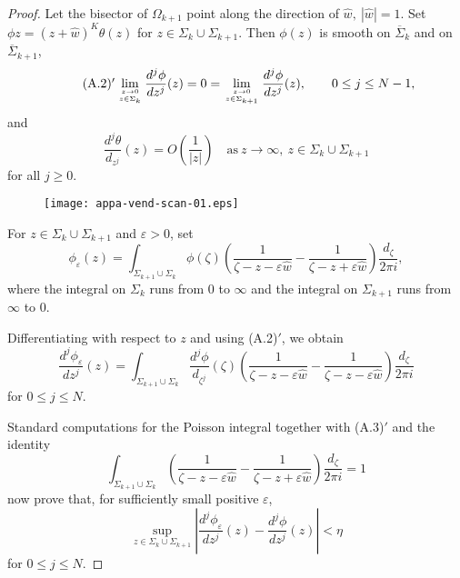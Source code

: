 \documentclass{surv-l}
\theoremstyle{plain}
\theoremstyle{definition}
\numberwithin{equation}{chapter}
\begin{document}
{\begin{proof}
Let the bisector of $\Omega_{k+1}$ point along the direction of $\hat{w},\ |\hat{w}|=1$. Set $\phi{z}=(z+\hat{w})^{K}\theta(z)$ for $z\in\Sigma_{k}\cup\Sigma_{k+1}$. Then $\phi(z)$ is smooth on $\overline{\Sigma}_{k}$ and on $\overline{\Sigma}_{k+1}$,
\begin{equation*}
\tag*{(A.2)$'$}\lim_{{z\rightarrow 0}\atop{z\in\Sigma_{k}}}\frac{d^{j}\phi}{dz^{j}}(z) = 0 = \lim_{{z\rightarrow 0}\atop{z\in\Sigma_{k+1}}}\frac{d^{j}\phi}{dz^{j}}(z),\qquad 0\leq j\leq N-1,
\end{equation*}
and
\begin{equation*}
\tag*{(A.3)$'$}\frac{d^{j}{\theta}}{d_{z^{j}}}(z)=O\left(\frac{1}{|z|}\right)\quad \mathrm{as}\ z\rightarrow\infty,\ z\in\Sigma_{k}\cup\Sigma_{k+1}
\end{equation*}
for all $j\geq 0$.
\setcounter{figure}{15}
\begin{figure}
\texttt{[image: appa-vend-scan-01.eps]}
\caption{}
\label{AppA:fig16}
\end{figure}

For $z\in\Sigma_{k}\cup\Sigma_{k+1}$ and $\varepsilon >0$, set
\begin{equation}\label{eqA.6} \phi_{\varepsilon}(z)=\int_{\Sigma_{k+1}\cup\Sigma_{k}}\phi(\zeta)\left(\frac{1}{\zeta-z-\varepsilon\hat{w}}-\frac{1}{\zeta-z+\varepsilon\hat{w}}\right) \frac{d_{\zeta}}{2\pi i},
\end{equation}
where the integral on $\Sigma_{k}$ runs from $0$ to $\infty$ and the integral on $\Sigma_{k+1}$ runs from $\infty$ to $0$.

Differentiating with respect to $z$ and using (A.2)$'$, we obtain
\begin{equation}\label{eqA.7}
\frac{d^{j}\phi_{\varepsilon}}{dz^{j}}(z)=\int_{\Sigma_{k+1}\cup\Sigma_{k}}\frac{d^{j}\phi}{d_{\zeta^{j}}}(\zeta)\left(\frac{1}{\zeta-z-\varepsilon\hat{w}}-\frac{1}{\zeta-z-\varepsilon\hat{w}}\right) \frac{d_{\zeta}}{2\pi i}
\end{equation}
for $0\leq j\leq N$.

Standard computations for the Poisson integral together with (A.3)$'$ and the identity
\begin{equation*}
\int_{\Sigma_{k+1}\cup\Sigma_{k}}\left(\frac{1}{\zeta-z-\varepsilon\hat{w}}-\frac{1}{\zeta-z+\varepsilon\hat{w}}\right)\frac{d_{\zeta}}{2\pi i}=1
\end{equation*}
now prove that, for sufficiently small positive $\varepsilon$,
\begin{equation}\label{eqA.8}
\sup_{z\in\Sigma_{k}\cup\Sigma_{k+1}}\left|\frac{d^{j}\phi_{\varepsilon}}{dz^{j}}(z)-\frac{d^{j}\phi}{dz^{j}}(z)\right|<\eta
\end{equation}
for $0\leq j\leq N$.


\end{proof}}
\end{document}
